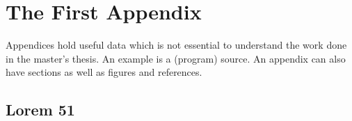 \chapter{The First Appendix}
\label{app:A}
Appendices hold useful data which is not essential to understand the work
done in the master's thesis. An example is a (program) source.
An appendix can also have sections as well as figures and references.

\section{Lorem 51}

